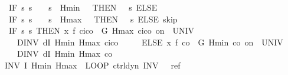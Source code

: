 \documentclass[envcountsame,envcountsect]{llncs}
\begin{document}
\begin{example}
\begin{isabellebody}
\ \ \ {\isacharparenleft}IF\ {\isacharparenleft}{\isasymlambda}s{\isachardot}\ s{\isachardollar}{}\ {\isacharequal}\ {}\ {\isasymand}\ s{\isachardollar}{}\ {\isasymle}\ Hmin\ {\isacharplus}\ {}{\isacharparenright}\ THEN\ {\isacharparenleft}{}\ {\isacharcolon}{\isacharcolon}{\isacharequal}\ {\isacharparenleft}{\isasymlambda}s{\isachardot}{}{\isacharparenright}{\isacharparenright}\ ELSE\ \isanewline
\ \ \ {\isacharparenleft}IF\ {\isacharparenleft}{\isasymlambda}s{\isachardot}\ s{\isachardollar}{}\ {\isacharequal}\ {}\ {\isasymand}\ s{\isachardollar}{}\ {\isasymge}\ Hmax\ {\isacharminus}\ {}{\isacharparenright}\ THEN\ {\isacharparenleft}{}\ {\isacharcolon}{\isacharcolon}{\isacharequal}\ {\isacharparenleft}{\isasymlambda}s{\isachardot}{}{\isacharparenright}{\isacharparenright}\ ELSE\ skip{\isacharparenright}{\isacharparenright}{\isacharsemicolon}\isanewline
\ \ \ %
\isanewline
\ \ \ {\isacharparenleft}IF\ {\isacharparenleft}{\isasymlambda}s{\isachardot}\ s{\isachardollar}{}{\isacharequal}{}{\isacharparenright}\ THEN\ {\isacharparenleft}x{\isasymacute}{\isacharequal}\ f\ {\isacharparenleft}c\isactrlsub i{\isacharminus}c\isactrlsub o{\isacharparenright}\ {\isacharampersand}\ G\ Hmax\ {\isacharparenleft}c\isactrlsub i{\isacharminus}c\isactrlsub o{\isacharparenright}\ on\ {\isacharbraceleft}{}{\isachardot}{\isachardot}{\isasymtau}{\isacharbraceright}\ UNIV\ {\isacharat}\ {}\isanewline 
\ \ \ \ \ DINV\ {\isacharparenleft}dI\ Hmin\ Hmax\ {\isacharparenleft}c\isactrlsub i{\isacharminus}c\isactrlsub o{\isacharparenright}{\isacharparenright}{\isacharparenright}\ \isanewline
\ \ \ \ ELSE\ {\isacharparenleft}x{\isasymacute}{\isacharequal}\ f\ {\isacharparenleft}{\isacharminus}c\isactrlsub o{\isacharparenright}\ {\isacharampersand}\ G\ Hmin\ {\isacharparenleft}{\isacharminus}c\isactrlsub o{\isacharparenright}\ on\ {\isacharbraceleft}{}{\isachardot}{\isachardot}{\isasymtau}{\isacharbraceright}\ UNIV\ {\isacharat}\ {}\isanewline 
\ \ \ \ \ DINV\ {\isacharparenleft}dI\ Hmin\ Hmax\ {\isacharparenleft}{\isacharminus}c\isactrlsub o{\isacharparenright}{\isacharparenright}{\isacharparenright}{\isacharparenright}\ {\isacharparenright}\isanewline
\ \ INV\ I\ Hmin\ Hmax{\isacharparenright}{\isachardoublequoteclose}\ {\isacharparenleft}\ {\isachardoublequoteopen}LOOP\ {\isacharparenleft}{\isacharquery}ctrl{\isacharsemicolon}{\isacharquery}dyn{\isacharparenright}\ INV\ {\isacharunderscore}\ {\isasymle}\ {\isacharquery}ref{\isachardoublequoteclose}{\isacharparenright}\isanewline

\end{isabellebody}
\end{example}
\end{document}
